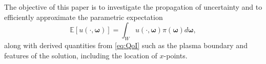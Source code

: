 The objective of this paper is to investigate the propagation of uncertainty and to efficiently approximate the parametric expectation
%
 \begin{equation}
 \label{eq:QoI}
      \mathbb{E}\left[u(\cdot,\boldsymbol \omega)\right]=\int_W u(\cdot,\boldsymbol{\omega})\pi(\boldsymbol\omega)d\boldsymbol{\omega},
 \end{equation}
%
along with derived quantities from \eqref{eq:QoI} such as the plasma boundary and features of the solution, including the location of $x$-points.







